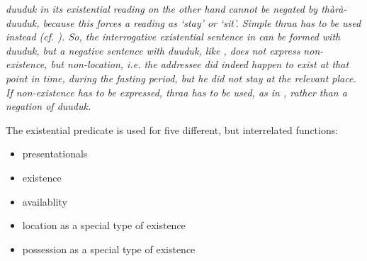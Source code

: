
 \em duuduk \em in its existential reading on the other hand cannot be negated by \em thàrà-duuduk\em, because this forces a reading as `stay' or  `sit'. Simple \em thraa \em has to be used instead (cf. ). So, the interrogative existential sentence in  can be formed with \em duuduk\em, but a negative sentence with \em duuduk\em, like , does not express non-existence, but non-location, i.e. the addressee did indeed happen to exist at that point in time, during the fasting period, but he did not stay at the relevant place. If non-existence has to be expressed, \em thraa \em has to be used, as in , rather than a negation of \em duuduk\em.







The existential predicate is used for five different, but interrelated functions: 

\begin{itemize}
	\item presentationals  
	\item existence  
	\item availablity 
	\item location as a special type of existence 
	\item possession as a special type of existence 
\end{itemize}


